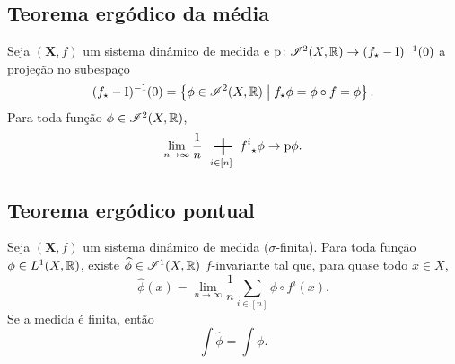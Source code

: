 
\subsection{Teorema ergódico da média}

\begin{theorem}
Seja $(\bm X,f)$ um sistema dinâmico de medida e $\mathrm{p}\colon \mathscr{I}^2(X,\mathbb{R}) \to (f_\star - \mathrm{I})^{-1}(0)$ a projeção no subespaço
	\begin{equation*}
	(f_\star - \mathrm{I})^{-1}(0) = \left\{ \phi \in \mathscr{I}^2(X,\mathbb{R}) \;\middle\vert\; f_\star \phi = \phi \circ f = \phi \right\}.
	\end{equation*}
Para toda função $\phi \in \mathscr{I}^2(X,\mathbb{R})$,
	\begin{equation*}
	\lim_{n \to \infty} \frac{1}{n} \sum_{i \in [n]} {f^i}\emp \phi \conv \proj \phi.
	\end{equation*}
\end{theorem}


\subsection{Teorema ergódico pontual}

\begin{theorem}
Seja $(\bm X,f)$ um sistema dinâmico de medida ($\sigma$-finita). Para toda função $\phi \in L^1(X,\mathbb{R})$, existe $\widehat{\phi} \in \mathscr{I}^1(X,\mathbb{R})$ $f$-invariante tal que, para quase todo $x \in X$,
	\begin{equation*}
	\widehat{\phi}(x) = \lim_{n \to \infty} \frac{1}{n} \sum_{i \in [n]} \phi \circ f^i(x).
	\end{equation*}
Se a medida é finita, então
	\begin{equation*}
	\int \widehat{\phi} = \int \phi.
	\end{equation*}
\end{theorem}

